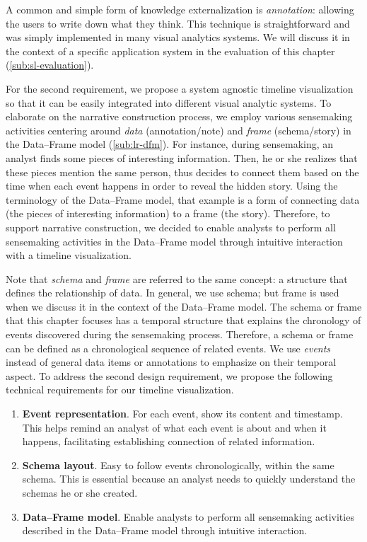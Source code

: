 A common and simple form of knowledge externalization is \emph{annotation}: allowing the users to write down what they think. This technique is straightforward and was simply implemented in many visual analytics systems. We will discuss it in the context of a specific application system in the evaluation of this chapter (\autoref{sub:sl-evaluation}).

For the second requirement, we propose a system agnostic timeline visualization so that it can be easily integrated into different visual analytic systems. To elaborate on the narrative construction process, we employ various sensemaking activities centering around \emph{data} (annotation/note) and \emph{frame} (schema/story) in the Data--Frame model (\autoref{sub:lr-dfm}). For instance, during sensemaking, an analyst finds some pieces of interesting information. Then, he or she realizes that these pieces mention the same person, thus decides to connect them based on the time when each event happens in order to reveal the hidden story. Using the terminology of the Data--Frame model, that example is a form of connecting data (the pieces of interesting information) to a frame (the story). Therefore, to support narrative construction, we decided to enable analysts to perform all sensemaking activities in the Data--Frame model through intuitive interaction with a timeline visualization. 

Note that \emph{schema} and \emph{frame} are referred to the same concept: a structure that defines the relationship of data. In general, we use schema; but frame is used when we discuss it in the context of the Data--Frame model. The schema or frame that this chapter focuses has a temporal structure that explains the chronology of events discovered during the sensemaking process. Therefore, a schema or frame can be defined as a chronological sequence of related events. We use \emph{events} instead of general data items or annotations to emphasize on their temporal aspect. To address the second design requirement, we propose the following technical requirements for our timeline visualization.

\begin{enumerate}
	\item \textbf{Event representation}. For each event, show its content and timestamp. This helps remind an analyst of what each event is about and when it happens, facilitating establishing connection of related information.
	\item \textbf{Schema layout}. Easy to follow events  chronologically, within the same schema. This is essential because an analyst needs to quickly understand the schemas he or she created.
	\item \textbf{Data--Frame model}. Enable analysts to perform all sensemaking activities described in the Data--Frame model through intuitive interaction.
\end{enumerate}